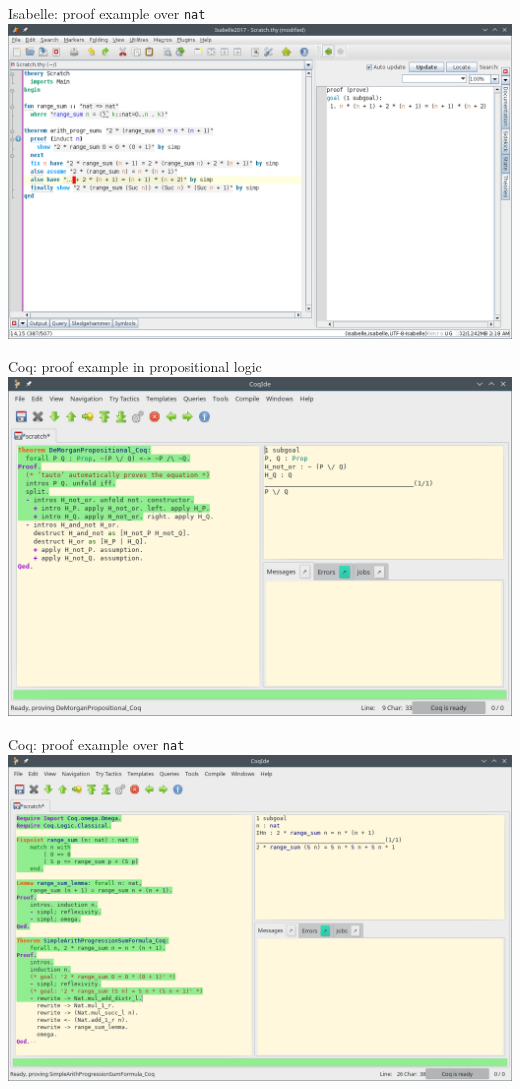 \documentclass[aspectratio=169, 12pt, fleqn]{beamer}
\begin{document}
\begin{frame}{Isabelle: proof example over \texttt{nat}}
\includegraphics[scale=0.39]{img/isabelle_arith.png}
\end{frame}



\begin{frame}
{Coq: proof example in propositional logic}
\includegraphics[scale=0.42]{img/coq_morgan.png}
\end{frame}

\begin{frame}{Coq: proof example over \texttt{nat}}
\includegraphics[scale=0.39]{img/gif-coq/coq-arith-6.png}
\end{frame}
\end{document}
